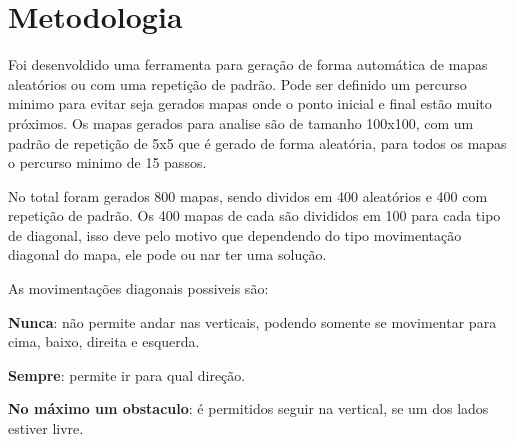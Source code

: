 \chapter[Metodologia]{Metodologia}

Foi desenvoldido uma ferramenta para geração de forma automática de mapas aleatórios ou com uma repetição de padrão. Pode ser definido um percurso minimo para evitar seja gerados mapas onde o ponto inicial e final estão muito próximos.
Os mapas gerados para analise são de tamanho 100x100, com um padrão de repetição de 5x5 que é gerado de forma aleatória, para todos os mapas o percurso minimo de 15 passos.

No total foram gerados 800 mapas, sendo dividos em 400 aleatórios e 400 com repetição de padrão.
Os 400 mapas de cada são divididos em 100 para cada tipo de diagonal, isso deve pelo motivo que dependendo do tipo movimentação diagonal do mapa, ele pode ou nar ter uma solução.

As movimentações diagonais possiveis são:

\textbf{Nunca}: não permite andar nas verticais, podendo somente se movimentar para cima, baixo, direita e esquerda.

\textbf{Sempre}: permite ir para qual direção.

\begin{minipage}{\linewidth}
    \label{fig:d_aways}
\end{minipage}

\textbf{No máximo um obstaculo}: é permitidos seguir na vertical, se um dos lados estiver livre.

\begin{minipage}{\linewidth}
    \label{fig:d_one}
\end{minipage}


